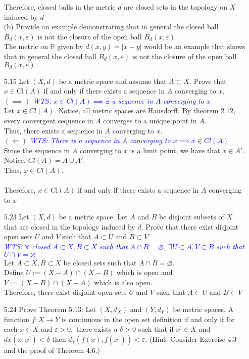 \documentclass[12pt]{article}
\newcommand{\R}{\mathbb{R}}
\newcommand{\wts}[1]{\textit{\textcolor{blue}{WTS: #1}}\\}
\newcommand{\1}{^{-1}}
\begin{document}
\begin{enumerate}
		Therefore, closed balls in the metric $d$ are closed sets in the topology on $X$ induced by $d$
		\\
		(b) Provide an example demonstrating that in general the closed ball $\bar{B}_{d}(x, \varepsilon)$ is not the closure of the open ball $B_{d}(x, \varepsilon)$\\
		The metric on $ \R $ given by $ d(x,y)=|x-y| $ would be an example that shows that in general the closed ball $\bar{B}_{d}(x, \varepsilon)$ is not the closure of the open ball $B_{d}(x, \varepsilon)$
		\item[5.15] Let $(X, d)$ be a metric space and assume that $A \subset X .$ Prove that $x \in \mathrm{Cl}(A)$ if and only if there exists a sequence in $A$ converging to $x$.\\
		$(\implies)$ \wts{$ x\in Cl(A)  \implies \exists$ a sequence in $ A $ converging to $ x $}
		Let $ x\in Cl(A) $. Notice, all metric spaces are Hausdorff. By theorem 2.12, every convergent sequence in $ A $ converges to a unique point in $ A $.\\
		Thus, there exists a sequence in $ A $ converging to $ x $.\\
		$(\Longleftarrow)$ \wts{There is a sequence in $ A $ converging to $ x \implies x\in Cl(A)$ }
		Since the sequence in $ A $ converging to $ x $ is a limit point, we have that $ x\in A' $. Notice, $ Cl(A)=A\cup A' $. \\
		Thus, $ x\in Cl(A) $.\\
		\\
		Therefore, $x \in \mathrm{Cl}(A)$ if and only if there exists a sequence in $A$ converging to $x$
		\item[5.23] Let $(X, d)$ be a metric space. Let $A$ and $B$ be disjoint subsets of $X$ that are closed in the topology induced by $d .$ Prove that there exist disjoint open sets $U$ and $V$ such that $A \subset U$ and $B \subset V$\\
		\wts{$\forall $ closed $ A\subset X, B \subset X$ such that $ A\cap B = \varnothing $, $ \exists U\subset A, V\subset B $ such that $ U\cap V = \varnothing $} 
		Let $ A\subset X, B\subset X $ be closed sets such that $ A\cap B = \varnothing $.\\
		Define $ U:= (X-A)\cap(X-B) $ which is open and $ V:=(X-B)\cap(X-A) $ which is also open. 
		\\
		Therefore, there exist disjoint open sets $U$ and $V$ such that $A \subset U$ and $B \subset V$
		\item[5.24] Prove Theorem 5.13: Let $\left(X, d_{X}\right)$ and $\left(Y, d_{Y}\right)$ be metric spaces. A function $f: X \rightarrow Y$ is continuous in the open set definition if and only if for each $x \in X$ and $\varepsilon>0,$ there exists a $\delta>0$ such that if $x^{\prime} \in X$ and $d x\left(x, x^{\prime}\right)<\delta$ then $d_{Y}\left(f(x), f\left(x^{\prime}\right)\right)<\varepsilon .$ (Hint: Consider Exercise 4.3 and the proof of Theorem 4.6.)\\

\end{enumerate}
\end{document}
